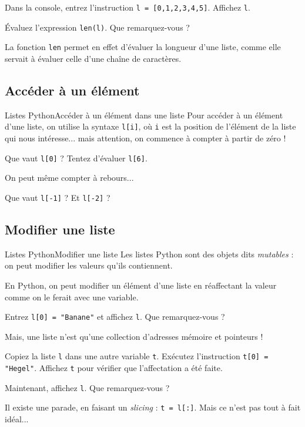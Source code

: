 \begin{frame}[fragile]
	\begin{exem}
		Dans la console, entrez l'instruction \lstinline|l = [0,1,2,3,4,5]|. Affichez \lstinline|l|.
		\pause
		
		Évaluez l'expression \lstinline|len(l)|. Que remarquez-vous ?
	\end{exem}
	
	La fonction \lstinline|len| permet en effet d'évaluer la longueur d'une liste, comme elle servait à évaluer celle d'une chaîne de caractères.
\end{frame}

\subsection{Accéder à un élément}

\begin{frame}[fragile]{Listes Python}{Accéder à un élément dans une liste}
	Pour accéder à un élément d'une liste, on utilise la syntaxe \lstinline|l[i]|, où \lstinline|i| est la position de l'élément de la liste qui nous intéresse... mais attention, on commence à compter à partir de zéro !
	\pause
	
	\begin{exem}
		Que vaut \lstinline|l[0]| ? Tentez d'évaluer \lstinline|l[6]|.
	\end{exem}
	\pause
	
	On peut même compter à rebours...
	\begin{exem}
		Que vaut \lstinline|l[-1]| ? Et \lstinline|l[-2]| ?
	\end{exem}
\end{frame}

\subsection{Modifier une liste}

\begin{frame}[fragile]{Listes Python}{Modifier une liste}
	Les listes Python sont des objets dits \textit{mutables} : on peut modifier les valeurs qu'ils contiennent.
	\pause
	
	En Python, on peut modifier un élément d'une liste en réaffectant la valeur comme on le ferait avec une variable.
	\begin{exem}
		Entrez \lstinline|l[0] = "Banane"| et affichez \lstinline|l|. Que remarquez-vous ?
	\end{exem}
	\pause
	
	Mais, une liste n'est qu'une collection d'adresses mémoire et pointeurs ! 
	\begin{exem}
	Copiez la liste \lstinline|l| dans une autre variable \lstinline|t|. Exécutez l'instruction \lstinline|t[0] = "Hegel"|. Affichez \lstinline|t| pour vérifier que l'affectation a été faite.
	\pause
	
	Maintenant, affichez \lstinline|l|. Que remarquez-vous ?
	\end{exem}
	
	Il existe une parade, en faisant un \textit{slicing} : \lstinline|t = l[:]|. Mais ce n'est pas tout à fait idéal...
\end{frame}

